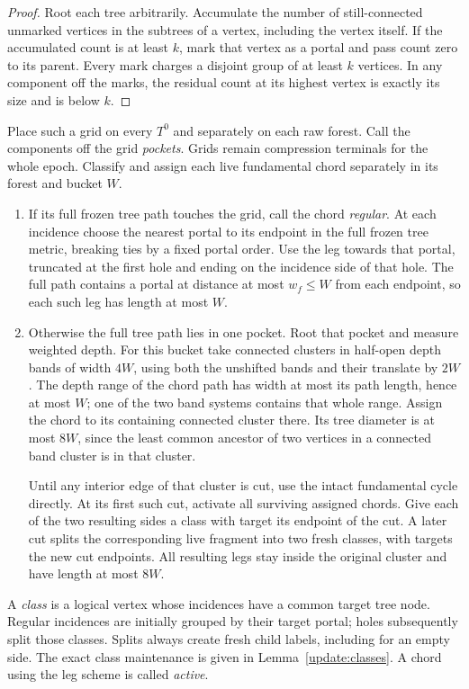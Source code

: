 \begin{proof}
Root each tree arbitrarily.  Accumulate the number of still-connected
unmarked vertices in the subtrees of a vertex, including the vertex
itself.  If the accumulated count is at least $k$, mark that vertex as
a portal and pass count zero to its parent.  Every mark charges a
disjoint group of at least $k$ vertices.  In any component off the
marks, the residual count at its highest vertex is exactly its size
and is below $k$.
\end{proof}

Place such a grid on every $T^0$ and separately on each raw forest.
Call the components off the grid \emph{pockets}.  Grids remain
compression terminals for the whole epoch.  Classify and assign each
live fundamental chord separately in its forest and bucket $W$.
\begin{enumerate}[label=(\roman*)]
\item If its full frozen tree path touches the grid, call the chord
\emph{regular}.  At each incidence choose the nearest portal to its
endpoint in the full frozen tree metric, breaking ties by a fixed
portal order.  Use the leg towards that portal, truncated at the first
hole and ending on the incidence side of that hole.  The full path
contains a portal at distance at most $w_f\le W$ from each endpoint,
so each such leg has length at most $W$.
\item Otherwise the full tree path lies in one pocket.  Root that
pocket and measure weighted depth.  For this bucket take connected
clusters in half-open depth bands of width $4W$, using both the
unshifted bands and their translate by $2W$.  The depth range of the
chord path has width at most its path length, hence at most $W$; one
of the two band systems contains that whole range.  Assign the chord
to its containing connected cluster there.  Its tree diameter is at
most $8W$, since the least common ancestor of two vertices in a
connected band cluster is in that cluster.

Until any interior edge of that cluster is cut, use the intact
fundamental cycle directly.  At its first such cut, activate all
surviving assigned chords.  Give each of the two resulting sides a
class with target its endpoint of the cut.  A later cut splits the
corresponding live fragment into two fresh classes, with targets the
new cut endpoints.  All resulting legs stay inside the original
cluster and have length at most $8W$.
\end{enumerate}

A \emph{class} is a logical vertex whose incidences have a common
target tree node.  Regular incidences are initially grouped by their
target portal; holes subsequently split those classes.  Splits always
create fresh child labels, including for an empty side.  The exact
class maintenance is given in Lemma~\ref{update:classes}.  A chord
using the leg scheme is called \emph{active}.

